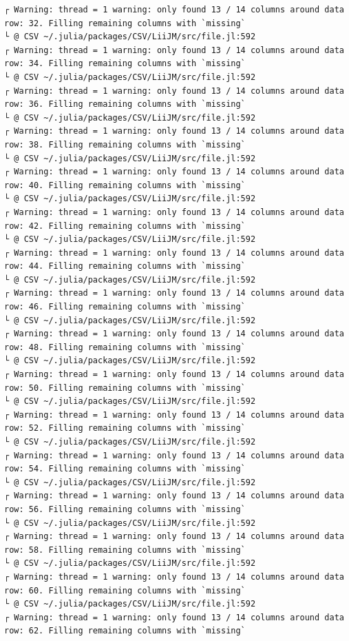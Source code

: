 \documentclass[
  letterpaper,
  DIV=11,
  numbers=noendperiod]{scrartcl}
\begin{document}
\begin{verbatim}
┌ Warning: thread = 1 warning: only found 13 / 14 columns around data row: 32. Filling remaining columns with `missing`
└ @ CSV ~/.julia/packages/CSV/LiiJM/src/file.jl:592
┌ Warning: thread = 1 warning: only found 13 / 14 columns around data row: 34. Filling remaining columns with `missing`
└ @ CSV ~/.julia/packages/CSV/LiiJM/src/file.jl:592
┌ Warning: thread = 1 warning: only found 13 / 14 columns around data row: 36. Filling remaining columns with `missing`
└ @ CSV ~/.julia/packages/CSV/LiiJM/src/file.jl:592
┌ Warning: thread = 1 warning: only found 13 / 14 columns around data row: 38. Filling remaining columns with `missing`
└ @ CSV ~/.julia/packages/CSV/LiiJM/src/file.jl:592
┌ Warning: thread = 1 warning: only found 13 / 14 columns around data row: 40. Filling remaining columns with `missing`
└ @ CSV ~/.julia/packages/CSV/LiiJM/src/file.jl:592
┌ Warning: thread = 1 warning: only found 13 / 14 columns around data row: 42. Filling remaining columns with `missing`
└ @ CSV ~/.julia/packages/CSV/LiiJM/src/file.jl:592
┌ Warning: thread = 1 warning: only found 13 / 14 columns around data row: 44. Filling remaining columns with `missing`
└ @ CSV ~/.julia/packages/CSV/LiiJM/src/file.jl:592
┌ Warning: thread = 1 warning: only found 13 / 14 columns around data row: 46. Filling remaining columns with `missing`
└ @ CSV ~/.julia/packages/CSV/LiiJM/src/file.jl:592
┌ Warning: thread = 1 warning: only found 13 / 14 columns around data row: 48. Filling remaining columns with `missing`
└ @ CSV ~/.julia/packages/CSV/LiiJM/src/file.jl:592
┌ Warning: thread = 1 warning: only found 13 / 14 columns around data row: 50. Filling remaining columns with `missing`
└ @ CSV ~/.julia/packages/CSV/LiiJM/src/file.jl:592
┌ Warning: thread = 1 warning: only found 13 / 14 columns around data row: 52. Filling remaining columns with `missing`
└ @ CSV ~/.julia/packages/CSV/LiiJM/src/file.jl:592
┌ Warning: thread = 1 warning: only found 13 / 14 columns around data row: 54. Filling remaining columns with `missing`
└ @ CSV ~/.julia/packages/CSV/LiiJM/src/file.jl:592
┌ Warning: thread = 1 warning: only found 13 / 14 columns around data row: 56. Filling remaining columns with `missing`
└ @ CSV ~/.julia/packages/CSV/LiiJM/src/file.jl:592
┌ Warning: thread = 1 warning: only found 13 / 14 columns around data row: 58. Filling remaining columns with `missing`
└ @ CSV ~/.julia/packages/CSV/LiiJM/src/file.jl:592
┌ Warning: thread = 1 warning: only found 13 / 14 columns around data row: 60. Filling remaining columns with `missing`
└ @ CSV ~/.julia/packages/CSV/LiiJM/src/file.jl:592
┌ Warning: thread = 1 warning: only found 13 / 14 columns around data row: 62. Filling remaining columns with `missing`

\end{verbatim}
\end{document}
